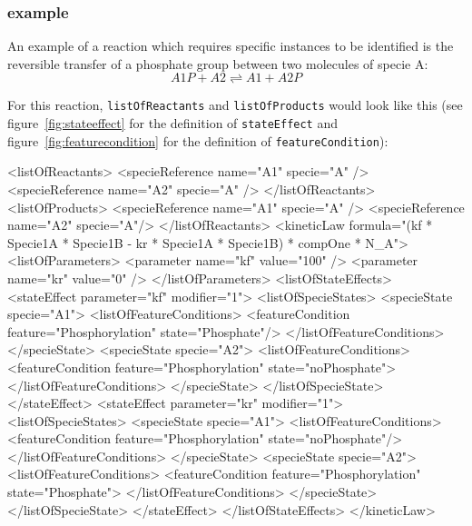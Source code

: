 \documentclass{cekarticle}
\begin{document}
\subsubsection{example}

An example of a reaction which requires specific instances to be
identified is the reversible transfer of a phosphate group between
two molecules of specie A:
\begin{displaymath}
  A1P + A2 \rightleftharpoons A1 + A2P
\end{displaymath}

For this reaction, \texttt{listOfReactants} and \texttt{listOfProducts} would
look like this (see figure~\ref{fig:stateeffect} for the definition of
\texttt{stateEffect} and figure~\ref{fig:featurecondition} for the definition of
\texttt{featureCondition}):

\begin{example}
<listOfReactants>
    <specieReference name="A1" specie="A" />
    <specieReference name="A2" specie="A" />
</listOfReactants>
<listOfProducts>
    <specieReference name="A1" specie="A" />
    <specieReference name="A2" specie="A"/>
</listOfReactants>
<kineticLaw formula="(kf * Specie1A * Specie1B - kr * Specie1A * Specie1B) * compOne * N_A">
    <listOfParameters>
        <parameter name="kf" value="100" />
        <parameter name="kr" value="0" />
    </listOfParameters>
    <listOfStateEffects>
        <stateEffect parameter="kf" modifier="1">
            <listOfSpecieStates>
                <specieState specie="A1">
                    <listOfFeatureConditions>
                        <featureCondition feature="Phosphorylation" state="Phosphate"/>
                    </listOfFeatureConditions>
                </specieState>
                <specieState specie="A2">
                    <listOfFeatureConditions>
                        <featureCondition feature="Phosphorylation" state="noPhosphate">
                    </listOfFeatureConditions>
                </specieState>
            </listOfSpecieState>
        </stateEffect>
         <stateEffect parameter="kr" modifier="1">
            <listOfSpecieStates>
                <specieState specie="A1">
                    <listOfFeatureConditions>
                        <featureCondition feature="Phosphorylation" state="noPhosphate"/>
                    </listOfFeatureConditions>
                </specieState>
                <specieState specie="A2">
                    <listOfFeatureConditions>
                        <featureCondition feature="Phosphorylation" state="Phosphate">
                    </listOfFeatureConditions>
                </specieState>
            </listOfSpecieState>
        </stateEffect>
    </listOfStateEffects>
</kineticLaw>
\end{example}
\end{document}
